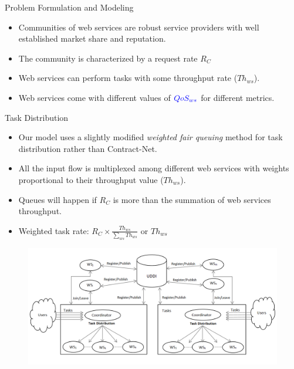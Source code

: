 \documentclass{beamer}
\begin{document}
\begin{frame}{Problem Formulation and Modeling}
    \begin{itemize}
        \item Communities of web services are robust service providers with well established {\color{blue}market share} and {\color{blue}reputation}.        
        \item The community is characterized by a {\color{blue}request rate $R_C$}
        \item Web services can perform tasks with some {\color{blue}throughput} rate ($Th_{ws}$).
        \item Web services come with different values of ${\color{blue}QoS_{ws}}$ for different metrics.
    \end{itemize}
\end{frame}

\begin{frame}{Task Distribution}
    \begin{itemize}
        \item Our model uses a slightly modified \emph{weighted fair queuing} method for task distribution rather than Contract-Net.
        \item All the input flow is multiplexed among different web services with weights proportional to their throughput value ($Th_{ws}$).
        \item Queues will happen if $R_C$ is more than the summation of web services throughput.
        \item Weighted task rate: $R_C \times \frac{Th_{ws}}{\sum_{ws}{Th_{ws}}}$ or $Th_{ws}$
    \end{itemize}
    \begin{figure}[htbp]
        \centering
        \includegraphics[width=0.8 \columnwidth]{figures/community.png}
    \end{figure}
\end{frame}
\end{document}

